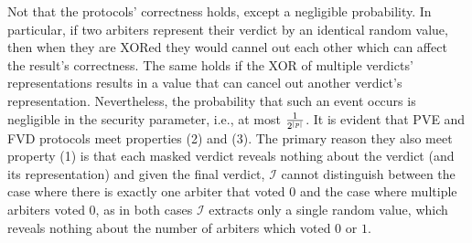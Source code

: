  
 Not that the protocols' correctness holds, except  a negligible  probability. In particular, if two arbiters  represent their verdict by an identical random value, then when they are XORed they would cannel out each other which can affect the result's correctness. The same holds if the XOR of  multiple verdicts' representations results in a value that can cancel out another verdict's representation. Nevertheless, the probability that such an event occurs is negligible in the security parameter, i.e., at most   $\frac{1}{2^{\scriptscriptstyle |p|}}$. It is evident that PVE and FVD protocols meet properties (2) and (3). The primary reason they also meet  property (1) is that each masked verdict reveals nothing about the verdict (and its representation) and  given the final verdict, $\mathcal{I}$ cannot distinguish between the case where there is exactly one arbiter that voted  $0$ and the case where multiple arbiters voted $0$, as in both cases $\mathcal{I}$   extracts only a single random value, which reveals nothing about the number of arbiters which voted $0$ or $1$. 
 
%  
 






